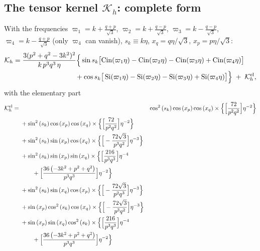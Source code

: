 {\subsection*{The tensor kernel \texorpdfstring{$\mathcal K_h$}{Kh}: complete form}
With the frequencies $\varpi_1=k+\tfrac{q+p}{\sqrt3}$, $\varpi_2=k+\tfrac{q-p}{\sqrt3}$, $\varpi_3=k-\tfrac{q-p}{\sqrt3}$, $\varpi_4=k-\tfrac{q+p}{\sqrt3}$ (only
$\varpi_4$ can vanish), $s_k\equiv k\eta$, $x_q=q\eta/\sqrt3$, $x_p=p\eta/\sqrt3$:
\begin{align*}
\mathcal K_h&=\frac{3(p^2+q^2-3k^2)^2}{k\,p^3q^3\,\eta}\Big\{\sin s_k\big[\mathrm{Cin}(\varpi_1\eta)-\mathrm{Cin}(\varpi_2\eta)-\mathrm{Cin}(\varpi_3\eta)+\mathrm{Cin}(\varpi_4\eta)\big]\\
&\hspace{9em}+\cos s_k\big[\operatorname{Si}(\varpi_1\eta)-\operatorname{Si}(\varpi_2\eta)-\operatorname{Si}(\varpi_3\eta)+\operatorname{Si}(\varpi_4\eta)\big]\Big\}\;+\;\mathcal K_h^{\rm el},
\end{align*}
with the elementary part
\begin{align*}
\mathcal K_h^{\rm el}={}&&\cos^{2}{\left(s_{k} \right)} \cos{\left(x_{p} \right)} \cos{\left(x_{q} \right)}\times\Big\{\Big[\frac{72}{p^{2} q^{2}}\Big]\eta^{-2}\Big\}\\
&+\sin^{2}{\left(s_{k} \right)} \cos{\left(x_{p} \right)} \cos{\left(x_{q} \right)}\times\Big\{\Big[\frac{72}{p^{2} q^{2}}\Big]\eta^{-2}\Big\}\\
&+\sin^{2}{\left(s_{k} \right)} \sin{\left(x_{p} \right)} \cos{\left(x_{q} \right)}\times\Big\{\Big[- \frac{72 \sqrt{3}}{p^{3} q^{2}}\Big]\eta^{-3}\Big\}\\
&+\sin^{2}{\left(s_{k} \right)} \sin{\left(x_{p} \right)} \sin{\left(x_{q} \right)}\times\Big\{\Big[\frac{216}{p^{3} q^{3}}\Big]\eta^{-4} \\ &\qquad +\Big[\frac{36 \left(- 3 k^{2} + p^{2} + q^{2}\right)}{p^{3} q^{3}}\Big]\eta^{-2}\Big\}\\
&+\sin^{2}{\left(s_{k} \right)} \sin{\left(x_{q} \right)} \cos{\left(x_{p} \right)}\times\Big\{\Big[- \frac{72 \sqrt{3}}{p^{2} q^{3}}\Big]\eta^{-3}\Big\}\\
&+\sin{\left(x_{p} \right)} \cos^{2}{\left(s_{k} \right)} \cos{\left(x_{q} \right)}\times\Big\{\Big[- \frac{72 \sqrt{3}}{p^{3} q^{2}}\Big]\eta^{-3}\Big\}\\
&+\sin{\left(x_{p} \right)} \sin{\left(x_{q} \right)} \cos^{2}{\left(s_{k} \right)}\times\Big\{\Big[\frac{216}{p^{3} q^{3}}\Big]\eta^{-4} \\ &\qquad +\Big[\frac{36 \left(- 3 k^{2} + p^{2} + q^{2}\right)}{p^{3} q^{3}}\Big]\eta^{-2}\Big\}\\

\end{align*}}
